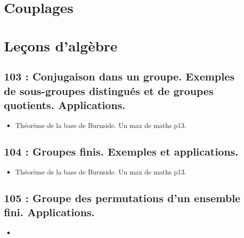 \documentclass[a4paper,10pt,oneside,twocolumn,landscape]{book}
\begin{document}
	\onecolumn  %
	\begin{titlepage}
	\end{titlepage}
	
	\onecolumn  %

\tableofcontents  %

\thispagestyle{empty}



\chapter{Couplages}

\newpage


\twocolumn  


\onecolumn


\chapter{Leçons d'algèbre}


\twocolumn










\section{103 : Conjugaison dans un groupe. Exemples de sous-groupes distingués et de groupes quotients. Applications.}
\begin{itemize}
	\item Théorème de la base de Burnside. Un max de maths p13.
\end{itemize}


\section{104 : Groupes finis. Exemples et applications.}
\begin{itemize}
	\item Théorème de la base de Burnside. Un max de maths p13.
\end{itemize}


\section{105  : Groupe des permutations d’un ensemble fini. Applications.}
\begin{itemize}
	\item 
\end{itemize}
\end{document}
